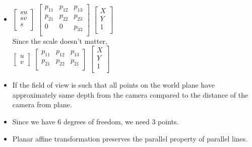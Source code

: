 \documentclass{article}
\begin{document}
\begin{itemize}
  
\item $\begin{bmatrix}
    su\\
    sv\\
    s\\
\end{bmatrix}$ $\begin{bmatrix}
    p_{11} &  p_{12} &  p_{13}\\
    p_{21} &  p_{22} &  p_{23}\\
    0 &  0 &  p_{33}\\
\end{bmatrix}$ $\begin{bmatrix}
    X\\
    Y\\
    1\\
\end{bmatrix}$ \\

Since the scale doesn't matter, \\

$\begin{bmatrix}
    u\\
    v
\end{bmatrix}$ $\begin{bmatrix}
    p_{11} &  p_{12} &  p_{13}\\
    p_{21} &  p_{22} &  p_{21}\\
\end{bmatrix}$ $\begin{bmatrix}
    X\\
    Y\\
    1\\
\end{bmatrix}$ \\

\item If the field of view is such that all points on the world plane have approximately same depth
  from the camera compared to the distance of the camera from plane.

\item Since we have 6 degrees of freedom, we need 3 points.
  
\item Planar affine transformation preserves the parallel property of parallel lines.  
\end{itemize}
\end{document}

